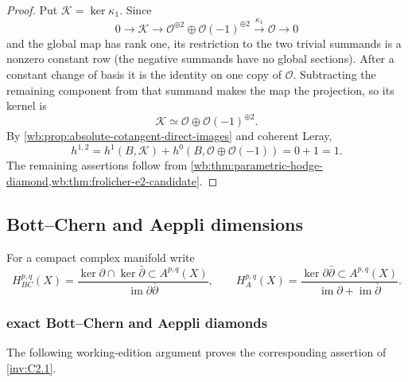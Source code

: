 \begin{proof}
Put $\mathcal K=\ker\kappa_1$.  Since
\[
0\longrightarrow\mathcal K\longrightarrow
\mathcal O^{\oplus2}\oplus\mathcal O(-1)^{\oplus2}
\xrightarrow{\kappa_1}\mathcal O\longrightarrow0
\]
and the global map has rank one, its restriction to the two trivial summands
is a nonzero constant row (the negative summands have no global sections).
After a constant change of basis it is the identity on one copy of
$\mathcal O$.  Subtracting the remaining component from that summand makes
the map the projection, so its kernel is
\[
 \mathcal K\simeq\mathcal O\oplus\mathcal O(-1)^{\oplus2}.
\]
By 
\cref{wb:prop:absolute-cotangent-direct-images} and coherent Leray,
\[
 h^{1,2}=h^1(B,\mathcal K)
 +h^0(B,\mathcal O\oplus\mathcal O(-1))=0+1=1.
\]
The remaining assertions follow from
\cref{wb:thm:parametric-hodge-diamond,wb:thm:frolicher-e2-candidate}.
\end{proof}

\subsection{Bott--Chern and Aeppli dimensions}

For a compact complex manifold write
\[
 H^{p,q}_{BC}(X)=
 \frac{\ker\partial\cap\ker\bar\partial\subset A^{p,q}(X)}
      {\operatorname{im}\partial\bar\partial},
 \qquad
 H^{p,q}_{A}(X)=
 \frac{\ker\partial\bar\partial\subset A^{p,q}(X)}
      {\operatorname{im}\partial+\operatorname{im}\bar\partial}.
\]

\subsubsection{exact Bott--Chern and Aeppli diamonds}\label{inv:wbproof:thm:exact-bott-chern-aeppli}
The following working-edition argument proves the corresponding assertion of \cref{inv:C2.1}.


